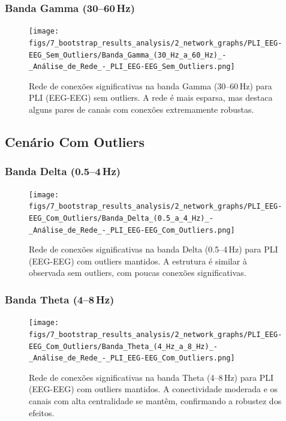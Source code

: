 \subsubsection{\texorpdfstring{Banda Gamma (30--60\,Hz)}{Banda Gamma (30-60 Hz)}}
\begin{figure}[htb]
  \centering
  \texttt{[image: figs/7\_bootstrap\_results\_analysis/2\_network\_graphs/PLI\_EEG-EEG\_Sem\_Outliers/Banda\_Gamma\_(30\_Hz\_a\_60\_Hz)\_-\_Análise\_de\_Rede\_-\_PLI\_EEG-EEG\_Sem\_Outliers.png]}
  \caption{Rede de conexões significativas na banda Gamma (30--60\,Hz) para PLI (EEG-EEG) sem outliers. A rede é mais esparsa, mas destaca alguns pares de canais com conexões extremamente robustas.}
  \label{fig:rede_pli_gamma_sem}
\end{figure}

\subsection{Cenário Com Outliers}
\subsubsection{\texorpdfstring{Banda Delta (0.5--4\,Hz)}{Banda Delta (0.5-4 Hz)}}
\begin{figure}[htb]
  \centering
  \texttt{[image: figs/7\_bootstrap\_results\_analysis/2\_network\_graphs/PLI\_EEG-EEG\_Com\_Outliers/Banda\_Delta\_(0.5\_a\_4\_Hz)\_-\_Análise\_de\_Rede\_-\_PLI\_EEG-EEG\_Com\_Outliers.png]}
  \caption{Rede de conexões significativas na banda Delta (0.5--4\,Hz) para PLI (EEG-EEG) com outliers mantidos. A estrutura é similar à observada sem outliers, com poucas conexões significativas.}
  \label{fig:rede_pli_delta_com}
\end{figure}

\subsubsection{\texorpdfstring{Banda Theta (4--8\,Hz)}{Banda Theta (4-8 Hz)}}
\begin{figure}[htb]
  \centering
  \texttt{[image: figs/7\_bootstrap\_results\_analysis/2\_network\_graphs/PLI\_EEG-EEG\_Com\_Outliers/Banda\_Theta\_(4\_Hz\_a\_8\_Hz)\_-\_Análise\_de\_Rede\_-\_PLI\_EEG-EEG\_Com\_Outliers.png]}
  \caption{Rede de conexões significativas na banda Theta (4--8\,Hz) para PLI (EEG-EEG) com outliers mantidos. A conectividade moderada e os canais com alta centralidade se mantêm, confirmando a robustez dos efeitos.}
  \label{fig:rede_pli_theta_com}
\end{figure}

